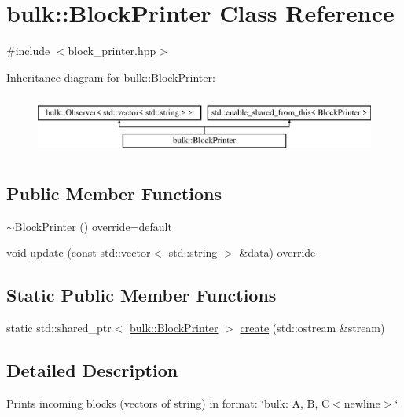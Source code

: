 \hypertarget{classbulk_1_1BlockPrinter}{}\section{bulk\+:\+:Block\+Printer Class Reference}
\label{classbulk_1_1BlockPrinter}


{\ttfamily \#include $<$block\+\_\+printer.\+hpp$>$}

Inheritance diagram for bulk\+:\+:Block\+Printer\+:\begin{figure}[H]
\begin{center}
\leavevmode
\includegraphics[height=2.000000cm]{classbulk_1_1BlockPrinter}
\end{center}
\end{figure}
\subsection*{Public Member Functions}
\begin{DoxyCompactItemize}
\item 
\hyperlink{classbulk_1_1BlockPrinter_ade61ac6f7602a0ee469244c98f43bc03}{$\sim$\+Block\+Printer} () override=default
\item 
void \hyperlink{classbulk_1_1BlockPrinter_a9f961b39d2c0bf9112524bf6773bb3e1}{update} (const std\+::vector$<$ std\+::string $>$ \&data) override
\end{DoxyCompactItemize}
\subsection*{Static Public Member Functions}
\begin{DoxyCompactItemize}
\item 
static std\+::shared\+\_\+ptr$<$ \hyperlink{classbulk_1_1BlockPrinter}{bulk\+::\+Block\+Printer} $>$ \hyperlink{classbulk_1_1BlockPrinter_ad0e918167006db76007fb2520ef3d228}{create} (std\+::ostream \&stream)
\end{DoxyCompactItemize}


\subsection{Detailed Description}
Prints incoming blocks (vectors of string) in format\+: \char`\"{}bulk\+: A, B, C$<$newline$>$\char`\"{} 

